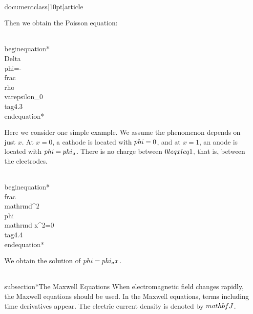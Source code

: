 \\documentclass[10pt]{article}
\begin{document}
Then we obtain the Poisson equation:


\\begin{equation*}
\\Delta \\phi=-\\frac{\\rho}{\\varepsilon_{0}} \\tag{4.3}
\\end{equation*}


Here we consider one simple example. We assume the phenomenon depends on just $x$. At $x=0$, a cathode is located with $\\phi=0$, and at $x=1$, an anode is located with $\\phi=\\phi_{a}$. There is no charge between $0 \\leq x \\leq 1$, that is, between the electrodes.


\\begin{equation*}
\\frac{\\mathrm{d}^{2} \\phi}{\\mathrm{d} x^{2}}=0 \\tag{4.4}
\\end{equation*}


We obtain the solution of $\\phi=\\phi_{a} x$.

\\subsection*{The Maxwell Equations}
When electromagnetic field changes rapidly, the Maxwell equations should be used. In the Maxwell equations, terms including time derivatives appear. The electric current density is denoted by $\\mathbf{J}$.
\end{document}
